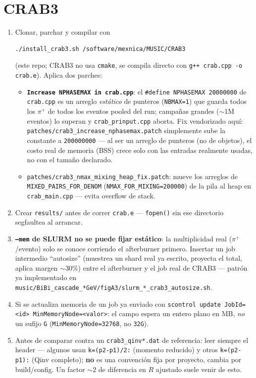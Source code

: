 \documentclass[11pt]{article}
\begin{document}
\section{CRAB3}

\begin{enumerate}[leftmargin=*]
  \item Clonar, parchar y compilar con
\begin{Verbatim}[fontsize=\small]
./install_crab3.sh /software/mexnica/MUSIC/CRAB3
\end{Verbatim}
  (este repo; CRAB3 no usa \texttt{cmake}, se compila directo con
  \texttt{g++ crab.cpp -o crab.e}). Aplica dos parches:
  \begin{itemize}
    \item \textbf{\texttt{Increase NPHASEMAX in crab.cpp}}: el
    \texttt{\#define NPHASEMAX 20000000} de \texttt{crab.cpp} es un arreglo
    \emph{estático} de punteros (\texttt{NBMAX=1}) que guarda todos los
    $\pi^+$ de todos los eventos pooled del run; campañas grandes
    ($\sim$1M eventos) lo superan y \texttt{crab\_prinput.cpp} aborta. Fix
    vendorizado aquí: \texttt{patches/crab3\_increase\_nphasemax.patch}
    simplemente sube la constante a \texttt{200000000} --- al ser un
    arreglo de punteros (no de objetos), el costo real de memoria (BSS)
    crece solo con las entradas realmente usadas, no con el tamaño
    declarado.
    \item \texttt{patches/crab3\_nmax\_mixing\_heap\_fix.patch}: mueve los
    arreglos de \texttt{MIXED\_PAIRS\_FOR\_DENOM}
    (\texttt{NMAX\_FOR\_MIXING=200000}) de la pila al heap en
    \texttt{crab\_main.cpp} --- evita overflow de stack.
  \end{itemize}
  \item Crear \texttt{results/} antes de correr \texttt{crab.e} ---
  \texttt{fopen()} sin ese directorio segfaultea al arrancar.
  \item \textbf{\texttt{--mem} de SLURM no se puede fijar estático}: la
  multiplicidad real ($\pi^+$/evento) solo se conoce corriendo el
  afterburner primero. Insertar un job intermedio ``autosize'' (muestrea un
  shard real ya escrito, proyecta el total, aplica margen $\sim$30\%) entre
  el afterburner y el job real de CRAB3 --- patrón ya implementado en
  \texttt{music/BiBi\_cascade\_*GeV/figA3/slurm\_*\_crab3\_autosize.sh}.
  \item Si se actualiza memoria de un job ya enviado con
  \texttt{scontrol update JobId=<id> MinMemoryNode=<valor>}: el campo
  espera un entero plano en MB, \emph{no} un sufijo \texttt{G}
  (\texttt{MinMemoryNode=32768}, no \texttt{32G}).
  \item Antes de comparar contra un \texttt{crab3\_qinv*.dat} de
  referencia: leer siempre el header --- algunos usan
  \texttt{k=(p2-p1)/2:} (momento reducido) y otros \texttt{k=(p2-p1):}
  (Qinv completo); \textbf{no} es una convención fija por proyecto, cambia
  por build/config. Un factor $\sim$2 de diferencia en $R$ ajustado suele
  venir de esto.
\end{enumerate}
\end{document}
